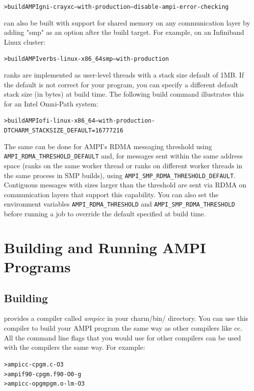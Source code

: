\documentclass[10pt]{article}
\begin{document}
\begin{alltt}
> build AMPI gni-crayxc --with-production --disable-ampi-error-checking
\end{alltt}

\ampi{} can also be built with support for shared memory on any communication layer
by adding "smp" as an option after the build target. For example, on an Infiniband Linux cluster:
\begin{alltt}
> build AMPI verbs-linux-x86_64 smp --with-production
\end{alltt}

\ampi{} ranks are implemented as user-level threads with a stack size default of 1MB.
If the default is not correct for your program, you can specify a different default
stack size (in bytes) at build time. The following build command illustrates this
for an Intel Omni-Path system:

\begin{alltt}
> build AMPI ofi-linux-x86_64 --with-production -DTCHARM_STACKSIZE_DEFAULT=16777216
\end{alltt}

The same can be done for AMPI's RDMA messaging threshold using \texttt{AMPI\_RDMA\_THRESHOLD\_DEFAULT} and,
for messages sent within the same address space (ranks on the same worker thread or ranks
on different worker threads in the same process in SMP builds), using \texttt{AMPI\_SMP\_RDMA\_THRESHOLD\_DEFAULT}.
Contiguous messages with sizes larger than the threshold are sent via RDMA on communication layers that
support this capability. You can also set the environment variables \texttt{AMPI\_RDMA\_THRESHOLD} and \texttt{AMPI\_SMP\_RDMA\_THRESHOLD}
before running a job to override the default specified at build time.

\section{Building and Running AMPI Programs}
\subsection{Building}
\ampi{} provides a compiler called \emph{ampicc} in your charm/bin/ directory.
You can use this compiler to build your AMPI program the same way as other
compilers like cc. All the command line flags that you would use
for other compilers can be used with the \ampi{} compilers the same way.
For example:

\begin{alltt}
> ampicc -c pgm.c -O3
> ampif90 -c pgm.f90 -O0 -g
> ampicc -o pgm pgm.o -lm -O3 
\end{alltt}
\end{document}
